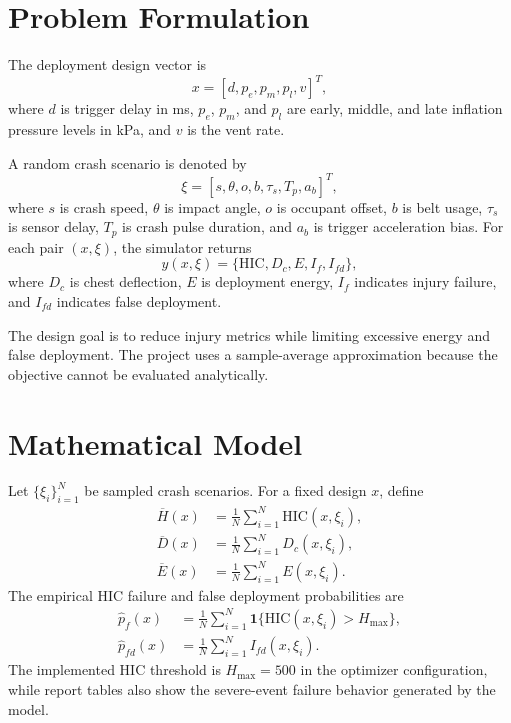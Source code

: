 \documentclass[conference]{IEEEtran}
\begin{document}
\section{Problem Formulation}
The deployment design vector is
\begin{equation}
x = [d, p_e, p_m, p_l, v]^T,
\end{equation}
where $d$ is trigger delay in ms, $p_e$, $p_m$, and $p_l$ are early, middle, and late inflation pressure levels in kPa, and $v$ is the vent rate.

A random crash scenario is denoted by
\begin{equation}
\xi = [s, \theta, o, b, \tau_s, T_p, a_b]^T,
\end{equation}
where $s$ is crash speed, $\theta$ is impact angle, $o$ is occupant offset, $b$ is belt usage, $\tau_s$ is sensor delay, $T_p$ is crash pulse duration, and $a_b$ is trigger acceleration bias. For each pair $(x,\xi)$, the simulator returns
\begin{equation}
y(x,\xi)=\{\mathrm{HIC},D_c,E,I_f,I_{fd}\},
\end{equation}
where $D_c$ is chest deflection, $E$ is deployment energy, $I_f$ indicates injury failure, and $I_{fd}$ indicates false deployment.

The design goal is to reduce injury metrics while limiting excessive energy and false deployment. The project uses a sample-average approximation because the objective cannot be evaluated analytically.

\section{Mathematical Model}
Let $\{\xi_i\}_{i=1}^{N}$ be sampled crash scenarios. For a fixed design $x$, define
\begin{align}
\overline{H}(x) &= \frac{1}{N}\sum_{i=1}^{N}\mathrm{HIC}(x,\xi_i),\\
\overline{D}(x) &= \frac{1}{N}\sum_{i=1}^{N}D_c(x,\xi_i),\\
\overline{E}(x) &= \frac{1}{N}\sum_{i=1}^{N}E(x,\xi_i).
\end{align}
The empirical HIC failure and false deployment probabilities are
\begin{align}
\hat{p}_f(x) &= \frac{1}{N}\sum_{i=1}^{N}\mathbf{1}\{\mathrm{HIC}(x,\xi_i)>H_{\max}\},\\
\hat{p}_{fd}(x) &= \frac{1}{N}\sum_{i=1}^{N}I_{fd}(x,\xi_i).
\end{align}
The implemented HIC threshold is $H_{\max}=500$ in the optimizer configuration, while report tables also show the severe-event failure behavior generated by the model.
\end{document}
